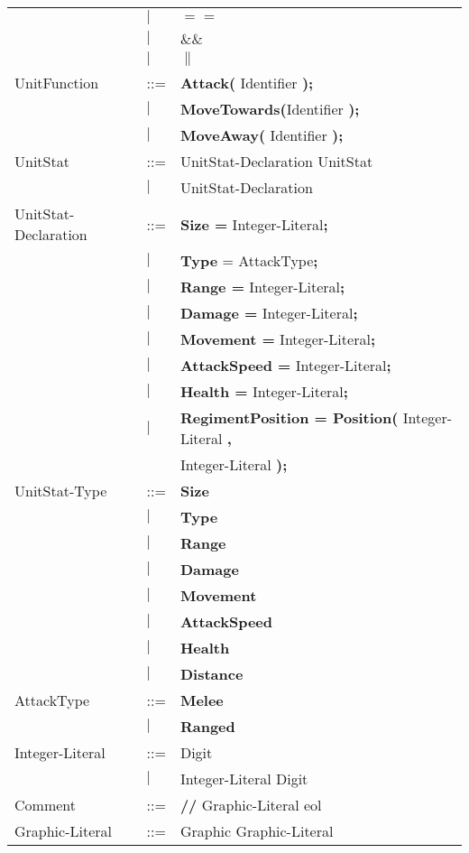 \begin{center}
\begin{longtable}{l l l}
							&$\mid$	&$\boldsymbol {==}$\\
							&$\mid$	&$\boldsymbol {\&\&}$\\
							&$\mid$	&$\boldsymbol {\|}$\\
UnitFunction				&	::=	&{\bf Attack(} Identifier {\bf );} \\
							&$\mid$	&{\bf MoveTowards(}Identifier {\bf );} \\
							&$\mid$	&{\bf MoveAway(} Identifier {\bf );} \\
UnitStat					&	::=	&UnitStat-Declaration UnitStat \\
							&$\mid$	&UnitStat-Declaration \\
UnitStat-Declaration		&	::=	&{\bf Size =} Integer-Literal{\bf ;} \\
							&$\mid$	&{\bf Type} = AttackType{\bf ;}\\
							&$\mid$	&{\bf  Range =} Integer-Literal{\bf;}\\
							&$\mid$	&{\bf Damage =} Integer-Literal{\bf ;}\\
							&$\mid$	&{\bf Movement = }Integer-Literal{\bf ;} \\				  
							&$\mid$	&{\bf AttackSpeed = }Integer-Literal{\bf ;} \\				  
							&$\mid$	&{\bf Health = }Integer-Literal{\bf ;} \\				  
							&$\mid$	& {\bf RegimentPosition = Position(} Integer-Literal {\bf ,}\\
							&		& Integer-Literal {\bf );}\\
UnitStat-Type				&	::=	&{\bf Size}\\
							&$\mid$	&{\bf Type}\\
							&$\mid$	&{\bf Range}\\
							&$\mid$	&{\bf Damage}\\
							&$\mid$	&{\bf Movement}\\
							&$\mid$	&{\bf AttackSpeed}\\
							&$\mid$	&{\bf Health}\\
							&$\mid$	&{\bf Distance}\\
AttackType					&	::=	&{\bf Melee}\\
							&$\mid$	&{\bf Ranged}\\
Integer-Literal				&	::=	&Digit\\
							&$\mid$	&Integer-Literal Digit\\
Comment						&	::=	&{\bf //} Graphic-Literal eol\\
Graphic-Literal				&	::=	&Graphic Graphic-Literal\\

\end{longtable}
\end{center}
